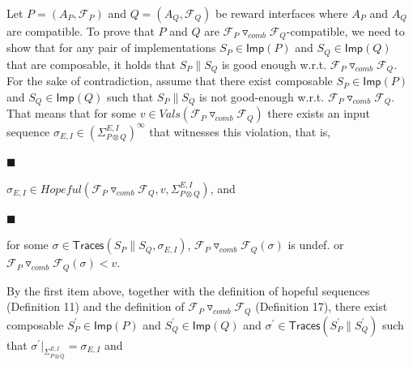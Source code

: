 \documentclass[10pt,a4paper]{article}
\begin{document}
Let $P=(A_{P},\mathcal{F}_{P})$ and $Q=(A_{Q},\mathcal{F}_{Q})$ be reward interfaces where $A_{P}$ and $A_{Q}$ are compatible. To prove that $P$ and $Q$ are ${{\mathcal{F}_{P}}\mathbin{\triangledown_{\mathit{comb}}}{\mathcal{F}_{Q}}}$-compatible, we need to show that for any pair of implementations $S_{P}\in\mathsf{Imp}(P)$ and $S_{Q}\in\mathsf{Imp}(Q)$ that are composable, it holds that $S_{P}\parallel S_{Q}$ is good enough w.r.t. ${{\mathcal{F}_{P}}\mathbin{\triangledown_{\mathit{comb}}}{\mathcal{F}_{Q}}}$. For the sake of contradiction, assume that there exist composable $S_{P}\in\mathsf{Imp}(P)$ and $S_{Q}\in\mathsf{Imp}(Q)$ such that $S_{P}\parallel S_{Q}$ is not good-enough w.r.t. ${{\mathcal{F}_{P}}\mathbin{\triangledown_{\mathit{comb}}}{\mathcal{F}_{Q}}}$. That means that for some $v\in\mathit{Vals}({{\mathcal{F}_{P}}\mathbin{\triangledown_{\mathit{comb}}}{\mathcal{F}_{Q}}})$ there exists an input sequence $\sigma_{E,I}\in(\Sigma_{P\otimes Q}^{E,I})^{\infty}$ that witnesses this violation, that is,\par
  
\par\noindent  $\blacksquare$ 
 
$\sigma_{E,I}\in\mathit{Hopeful}({{\mathcal{F}_{P}}\mathbin{\triangledown_{\mathit{comb}}}{\mathcal{F}_{Q}}},v,\Sigma_{P\otimes Q}^{E,I})$, and\par
 
 
 
\par\noindent  $\blacksquare$ 
 
for some $\sigma\in\mathsf{Traces}(S_{P}\parallel S_{Q},\sigma_{E,I})$, ${{\mathcal{F}_{P}}\mathbin{\triangledown_{\mathit{comb}}}{\mathcal{F}_{Q}}}(\sigma)$ is undef. or ${{\mathcal{F}_{P}}\mathbin{\triangledown_{\mathit{comb}}}{\mathcal{F}_{Q}}}(\sigma)<v$.\par
 
 
  
By the first item above, together with the definition of hopeful sequences (Definition 11) and the definition of ${{\mathcal{F}_{P}}\mathbin{\triangledown_{\mathit{comb}}}{\mathcal{F}_{Q}}}$ (Definition 17), there exist composable $S_{P}^{\prime}\in\mathsf{Imp}(P)$ and $S_{Q}^{\prime}\in\mathsf{Imp}(Q)$ and $\sigma^{\prime}\in\mathsf{Traces}(S_{P}^{\prime}\parallel S_{Q}^{\prime})$ such that $\sigma^{\prime}|_{\Sigma_{P\otimes Q}^{E,I}}=\sigma_{E,I}$ and\par
  
\end{document}
